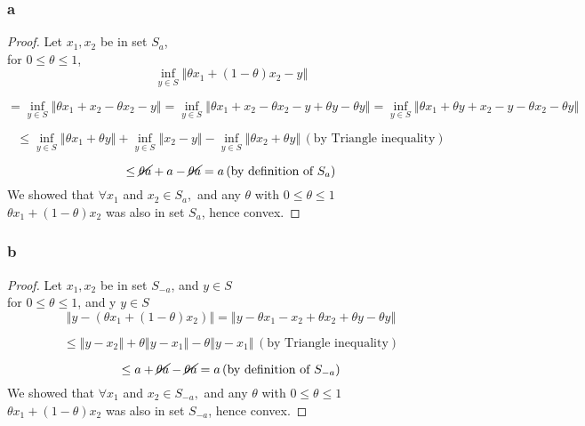 \documentclass{article}
\begin{document}
\subsubsection*{a}
\begin{proof}
Let $x_1, x_2$ be in set $S_a$,\\
for $0 \leq \theta \leq 1$,\\
\[\inf_{y \in S} \left\Vert \theta x_1 + (1-\theta) x_2 -y \right\Vert\]

\[ = \inf_{y \in S} \left\Vert \theta x_1 +x_2 -\theta x_2 -y \right\Vert = \inf _{y \in S}\left\Vert \theta x_1 +x_2 -\theta x_2 -y + \theta y -\theta y\right\Vert = \inf_{y \in S} \left\Vert \theta x_1+ \theta y  +x_2 -y  -\theta x_2  -\theta y\right\Vert  \]

\[\le  \inf_{y \in S} \left\Vert \theta x_1+ \theta y \right\Vert   +\inf_{y \in S} \left\Vert x_2 -y  \right\Vert -  \inf_{y \in S} \left\Vert  \theta x_2  + \theta y\right\Vert \, (\mbox{by Triangle inequality})  \]

\[\le \cancel{\theta a}  + a - \cancel{\theta a }  =a  \, (\mbox{by definition  of $S_a$)} \]
We showed that  $\forall x_1$ and $x_2 \in S_a,$ and any  $\theta$ with $0 \leq \theta \le 1$\\
$\theta x_1 + (1-\theta) x_2$ was also in set $S_a$, hence convex.
\end{proof}
\subsubsection*{b}
\begin{proof}

Let $x_1, x_2$ be in set $S_{-a}$, and $y \in S$\\
for $0 \leq \theta \leq 1$, and y $y \in S$\\

\[\left\Vert y  - (\theta x_1 + (1- \theta) x_2)\right\Vert  =  \left\Vert y  - \theta x_1 -x_2 +  \theta x_2   + \theta y - \theta y \right\Vert\]

\[\le \left\Vert y - x_2 \right\Vert + \theta \left\Vert y  - x_1 \right\Vert - \theta \left\Vert y  - x_1\right\Vert  \, (\mbox{by Triangle inequality})\]

\[\le a + \cancel{\theta a} - \cancel{\theta a } = a \, (\mbox{by definition  of $S_{-a}$)} \]
We showed that  $\forall x_1$ and $x_2 \in S_{-a},$ and any  $\theta$ with $0 \leq \theta \le 1$\\
$\theta x_1 + (1-\theta) x_2$ was also in set $S_{-a}$, hence convex.
\end{proof}
\end{document}
